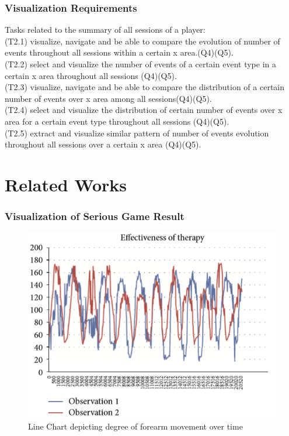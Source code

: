 \documentclass{beamer}
\begin{document}
\begin{frame}
\frametitle{Visualization Requirements}
Tasks related to the summary of all sessions of a player:\\
(T2.1) visualize, navigate and be able to compare the evolution of number of events throughout all sessions within a certain x area.(Q4)(Q5). \\
(T2.2) select and visualize the number of events of a certain event type in a certain x area throughout all sessions (Q4)(Q5).\\ 
(T2.3) visualize, navigate and be able to compare the distribution of a certain number of events over x area among all sessions(Q4)(Q5). \\
(T2.4) select and visualize the distribution of certain number of events over x area for a certain event type throughout all sessions (Q4)(Q5). \\
(T2.5) extract and visualize similar pattern of number of events evolution throughout all sessions over a certain x area (Q4)(Q5).
\end{frame}
\section{Related Works}
\begin{frame}
\frametitle{Visualization of Serious Game Result}
\begin{figure}
\includegraphics[scale=0.5]{images/rahman_viz.png}
\caption{Line Chart depicting degree of forearm movement over time}
\end{figure}
\end{frame}
\end{document}
